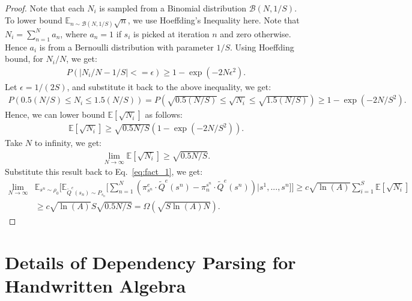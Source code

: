 \begin{proof}
Note that each $N_i$ is sampled from a Binomial distribution $\mathcal{B}(N, 1/S)$. To lower bound $\mathbb{E}_{n\sim \mathcal{B}(N,1/S)} \sqrt{n}$, we use Hoeffding's Inequality here.  Note that $N_i = \sum_{n=1}^N a_n$, where $a_n = 1$ if $s_i$ is picked at iteration $n$ and zero otherwise. Hence $a_i$ is from a Bernoulli distribution with parameter $1/S$. Using Hoeffding bound, for $N_i/N$, we get:
\begin{align}
P(|N_i/N - 1/S| <= \epsilon) \geq 1 - \exp(-2N\epsilon^2).
\end{align} Let $\epsilon = 1/(2S)$, and substitute it back to the above inequality, we get:
\begin{align}
P(0.5(N/S)\leq N_i \leq 1.5(N/S)) = P(\sqrt{0.5(N/S)}\leq \sqrt{N_i} \leq \sqrt{1.5(N/S)})\geq 1 - \exp(-2N/S^2).
\end{align}
Hence, we can lower bound $\mathbb{E}[\sqrt{N_i}]$ as follows:
\begin{align}
\mathbb{E}[\sqrt{N_i}] \geq \sqrt{0.5N/S}(1 - \exp(-2N/S^2)).
\end{align} Take $N$ to infinity, we get:
\begin{align}
\lim_{N\to\infty}\mathbb{E}[\sqrt{N_i}] \geq \sqrt{0.5N/S}.
\end{align}
Substitute this result back to Eq.~\ref{eq:fact_1}, we get:
\begin{align}
\lim_{N\to\infty}&\mathbb{E}_{s^n\sim\rho_0}\Big[\mathbb{E}_{\tilde{Q}^e(s_n)\sim P_{s_n}}\big[\sum_{n=1}^N( \pi^e_{s^n} \cdot \tilde{Q}^e(s^n) - \pi_n^{s^n}\cdot \tilde{Q}^e(s^n))|s^1,...,s^n\big]\Big]\geq c\sqrt{\ln(A)}\sum_{i=1}^S\mathbb{E}[\sqrt{N_i}] \nonumber\\
&\geq c\sqrt{\ln(A)}S\sqrt{0.5 N/S} = \Omega(\sqrt{S\ln(A)N}). \nonumber
\end{align}


\end{proof}


\section{Details of Dependency Parsing for Handwritten Algebra}